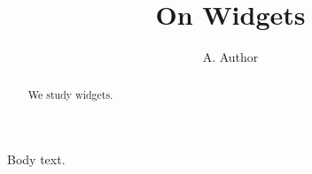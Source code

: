 \documentclass{tpwiley}
\begin{document}
\title{On Widgets}\author{A. Author}
\maketitle
\begin{abstract}
We study widgets.
\end{abstract}
Body text.
\end{document}
